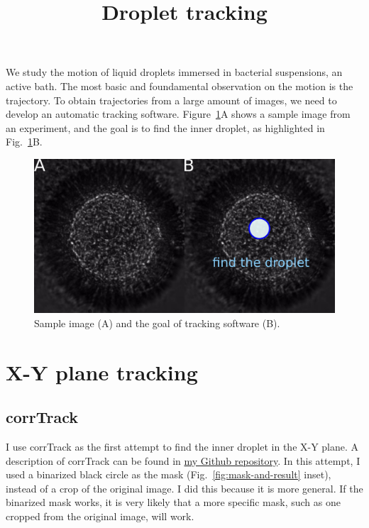 \documentclass[onecolumn,aps, pre,amsmath,amssymb,longbibliography,11pt]{revtex4-2}
\begin{document}
\title{Droplet tracking}
\maketitle

We study the motion of liquid droplets immersed in bacterial suspensions, an active bath.
The most basic and foundamental observation on the motion is the trajectory.
To obtain trajectories from a large amount of images, we need to develop an automatic tracking software.
Figure~\ref{fig:sample-image}A shows a sample image from an experiment, and the goal is to find the inner droplet, as highlighted in Fig.~\ref{fig:sample-image}B.

\begin{figure}[h]
  \includegraphics{sample-image.png}
  \caption{Sample image (A) and the goal of tracking software (B).}
  \label{fig:sample-image}
\end{figure}

\section{X-Y plane tracking}

\subsection{corrTrack}

I use corrTrack as the first attempt to find the inner droplet in the X-Y plane.
A description of corrTrack can be found in \href{https://github.com/ZLoverty/Python/tree/master/Tracking/corrTrack}{my Github repository}.
In this attempt, I used a binarized black circle as the mask (Fig.~\ref{fig:mask-and-result} inset), instead of a crop of the original image.
I did this because it is more general.
If the binarized mask works, it is very likely that a more specific mask, such as one cropped from the original image, will work.
\end{document}
